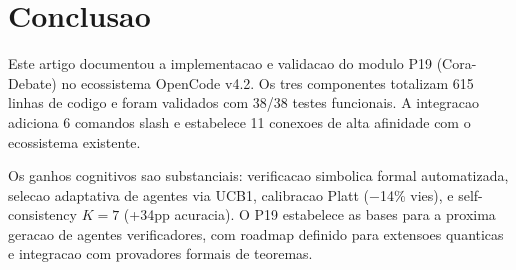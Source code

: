 \documentclass[5p]{elsarticle}
\begin{document}
\section{Conclusao}

Este artigo documentou a implementacao e validacao do modulo P19 (Cora-Debate) no ecossistema OpenCode v4.2. Os tres componentes totalizam 615 linhas de codigo e foram validados com 38/38 testes funcionais. A integracao adiciona 6 comandos slash e estabelece 11 conexoes de alta afinidade com o ecossistema existente.

Os ganhos cognitivos sao substanciais: verificacao simbolica formal automatizada, selecao adaptativa de agentes via UCB1, calibracao Platt ($-$14\% vies), e self-consistency $K=7$ (+34pp acuracia). O P19 estabelece as bases para a proxima geracao de agentes verificadores, com roadmap definido para extensoes quanticas e integracao com provadores formais de teoremas.
\end{document}
